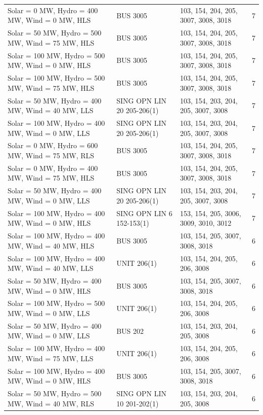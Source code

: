 \documentclass[10pt]{report}
\begin{document}
\begin{table}[H]
{\begin{tabular}{llp{8cm}r}
Solar = 0 MW, Hydro = 400 MW, Wind = 0 MW, HLS & BUS 3005 & 103, 154, 204, 205, 3007, 3008, 3018 & 7 \\
Solar = 50 MW, Hydro = 500 MW, Wind = 75 MW, HLS & BUS 3005 & 103, 154, 204, 205, 3007, 3008, 3018 & 7 \\
Solar = 100 MW, Hydro = 500 MW, Wind = 0 MW, HLS & BUS 3005 & 103, 154, 204, 205, 3007, 3008, 3018 & 7 \\
Solar = 100 MW, Hydro = 500 MW, Wind = 75 MW, HLS & BUS 3005 & 103, 154, 204, 205, 3007, 3008, 3018 & 7 \\
Solar = 50 MW, Hydro = 400 MW, Wind = 40 MW, LLS & SING OPN LIN   20 205-206(1) & 103, 154, 203, 204, 205, 3007, 3008 & 7 \\
Solar = 100 MW, Hydro = 400 MW, Wind = 0 MW, LLS & SING OPN LIN   20 205-206(1) & 103, 154, 203, 204, 205, 3007, 3008 & 7 \\
Solar = 0 MW, Hydro = 600 MW, Wind = 75 MW, RLS & BUS 3005 & 103, 154, 204, 205, 3007, 3008, 3018 & 7 \\
Solar = 0 MW, Hydro = 400 MW, Wind = 75 MW, HLS & BUS 3005 & 103, 154, 204, 205, 3007, 3008, 3018 & 7 \\
Solar = 50 MW, Hydro = 400 MW, Wind = 0 MW, LLS & SING OPN LIN   20 205-206(1) & 103, 154, 203, 204, 205, 3007, 3008 & 7 \\
Solar = 100 MW, Hydro = 400 MW, Wind = 0 MW, HLS & SING OPN LIN   6 152-153(1) & 153, 154, 205, 3006, 3009, 3010, 3012 & 7 \\
Solar = 100 MW, Hydro = 400 MW, Wind = 40 MW, HLS & BUS 3005 & 103, 154, 205, 3007, 3008, 3018 & 6 \\
Solar = 100 MW, Hydro = 400 MW, Wind = 40 MW, LLS & UNIT 206(1) & 103, 154, 204, 205, 206, 3008 & 6 \\
Solar = 50 MW, Hydro = 400 MW, Wind = 0 MW, HLS & BUS 3005 & 103, 154, 205, 3007, 3008, 3018 & 6 \\
Solar = 100 MW, Hydro = 500 MW, Wind = 0 MW, LLS & UNIT 206(1) & 103, 154, 204, 205, 206, 3008 & 6 \\
Solar = 50 MW, Hydro = 400 MW, Wind = 0 MW, LLS & BUS 202 & 103, 154, 203, 204, 205, 3008 & 6 \\
Solar = 100 MW, Hydro = 400 MW, Wind = 75 MW, LLS & UNIT 206(1) & 103, 154, 204, 205, 206, 3008 & 6 \\
Solar = 100 MW, Hydro = 400 MW, Wind = 0 MW, HLS & BUS 3005 & 103, 154, 205, 3007, 3008, 3018 & 6 \\
Solar = 50 MW, Hydro = 500 MW, Wind = 40 MW, RLS & SING OPN LIN   10 201-202(1) & 103, 154, 203, 204, 205, 3008 & 6 \\

\end{tabular}}
\end{table}
\end{document}
